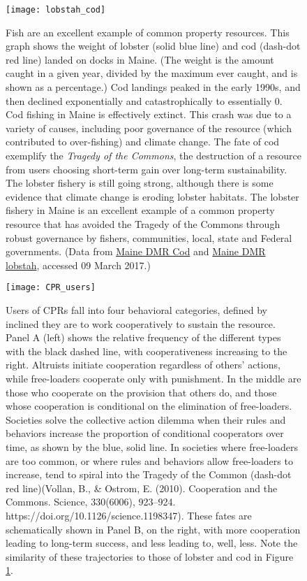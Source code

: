 \documentclass[amstex,12pt]{book}
\begin{document}
\newpage
\begin{figure}[p]
\centering
  \texttt{[image: lobstah\_cod]}%


\caption{Fish are an excellent example of common property resources. This graph shows the weight of lobster (solid blue line) and cod (dash-dot red line) landed on docks in Maine. (The weight is the amount caught in a given year, divided by the maximum ever caught, and is shown as a percentage.) Cod landings peaked in the early 1990s, and then declined exponentially and catastrophically to essentially 0. Cod fishing in Maine is effectively extinct. This crash was due to a variety of causes, including poor governance of the resource (which contributed to over-fishing) and climate change. The fate of cod exemplify the \emph{Tragedy of the Commons}, the destruction of a resource from users choosing short-term gain over long-term sustainability. The lobster fishery is still going strong, although there is some evidence that climate change is eroding lobster habitats. The lobster fishery in Maine is an excellent example of a common property resource that has avoided the Tragedy of the Commons through robust governance by fishers, communities, local, state and Federal governments. (Data from \href{http://www.maine.gov/dmr/commercial-fishing/landings/documents/cod.table.pdf}{Maine DMR Cod} and  
\href{http://www.maine.gov/dmr/commercial-fishing/landings/documents/lobster.table.pdf}{Maine DMR lobstah},  accessed 09 March 2017.)}
\label{fig:cod_lobstah}
\end{figure}


\newpage
\begin{figure}[p]
\centering
  \texttt{[image: CPR\_users]}%


\caption{Users of CPRs fall into four behavioral categories, defined by inclined they are to work cooperatively to sustain the resource. Panel A (left) shows the relative frequency of the different types with the black dashed line, with cooperativeness increasing to the right. Altruists initiate cooperation regardless of others' actions, while free-loaders cooperate only with punishment. In the middle are those who cooperate on the provision that others do, and those whose cooperation is conditional on the elimination of free-loaders. Societies solve the collective action dilemma when their rules and behaviors increase the proportion of conditional cooperators over time, as shown by the blue, solid line. In societies where free-loaders are too common, or where rules and behaviors allow free-loaders to increase, tend to spiral into the Tragedy of the Common (dash-dot red line)(Vollan, B., \& Ostrom, E. (2010). Cooperation and  the Commons. Science, 330(6006), 923–924. https://doi.org/10.1126/science.1198347). These fates are schematically shown in Panel B, on the right, with more cooperation leading to long-term success, and less leading to, well, less. Note the similarity of these trajectories to those of lobster and cod in Figure \ref{fig:cod_lobstah}.} 
\label{fig:CPR_users}
\end{figure}
\end{document}
